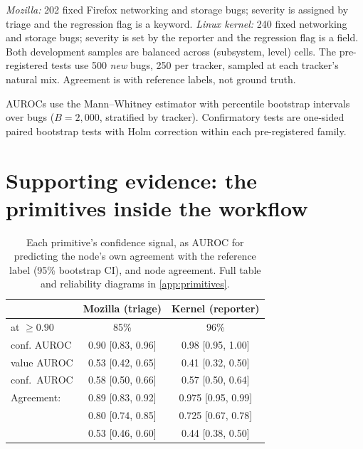  \emph{Mozilla:} 202 fixed Firefox networking and storage
bugs; severity is assigned by triage and the regression flag is a
keyword. \emph{Linux kernel:} 240 fixed networking and storage bugs;
severity is set by the reporter and the regression flag is a field. Both
development samples are balanced across (subsystem, level) cells. The
pre-registered tests use 500 \emph{new} bugs, 250 per tracker, sampled at
each tracker's natural mix. Agreement is with reference labels, not
ground truth.

 AUROCs use the Mann--Whitney estimator with percentile
bootstrap intervals over bugs ($B = 2{,}000$, stratified by tracker).
Confirmatory tests are one-sided paired bootstrap tests with Holm
correction within each pre-registered family.

\section{Supporting evidence: the primitives inside the workflow}
\label{sec:primitives}

\begin{table}[t]
\centering
\small
\setlength{\tabcolsep}{2pt}
\begin{tabular}{lcc}
\toprule
 & Mozilla (triage) & Kernel (reporter) \\
\midrule
\choice{} at $\geq 0.90$ & 85\% & 96\% \\
\choice{} conf. AUROC & 0.90 [0.83, 0.96] & 0.98 [0.95, 1.00] \\
\noul{} value AUROC & 0.53 [0.42, 0.65] & 0.41 [0.32, 0.50] \\
\score{} conf.\ AUROC & 0.58 [0.50, 0.66] & 0.57 [0.50, 0.64] \\
\midrule
Agreement: \choice{} & 0.89 [0.83, 0.92] & 0.975 [0.95, 0.99] \\
\phantom{Agreement:} \noul{} & 0.80 [0.74, 0.85] & 0.725 [0.67, 0.78] \\
\phantom{Agreement:} \score{} & 0.53 [0.46, 0.60] & 0.44 [0.38, 0.50] \\
\bottomrule
\end{tabular}
\caption{Each primitive's confidence signal, as AUROC for predicting the
node's own agreement with the reference label (95\% bootstrap CI), and
node agreement. Full table and reliability diagrams in \cref{app:primitives}.}
\label{tab:prim}
\end{table}

